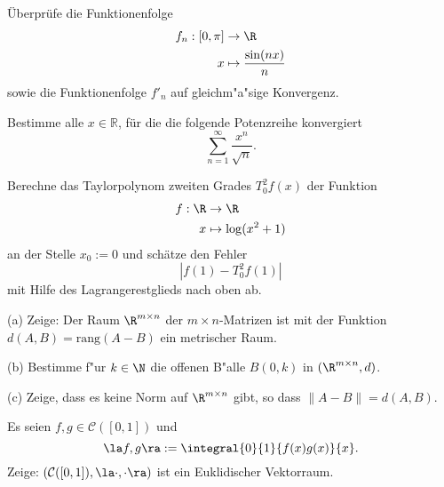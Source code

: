 \begin{prob}
Überprüfe die Funktionenfolge
\begin{equation*}
\begin{split}
f_n:[0,\pi]&\to\R\\
x&\mapsto \frac{\sin(nx)}{n}
\end{split}
\end{equation*}
sowie die Funktionenfolge $f'_n$ auf gleichm"a"sige Konvergenz.
\end{prob}

\vspace{0.3cm}

\begin{prob}
Bestimme alle $x\in \mathbb{R}$, für die die folgende Potenzreihe konvergiert
$$\sum_{n=1}^\infty \frac{x^n}{\sqrt{n}}.$$ 
\end{prob}

\vspace{0.3cm}

\begin{prob}
Berechne das Taylorpolynom  zweiten Grades $T_0^2f(x)$ der Funktion 
\begin{equation*}
\begin{split}
f:\R&\to\R\\
x&\mapsto \log(x^2+1)
\end{split}
\end{equation*}
an der Stelle $x_0:=0$ und schätze den Fehler
$$|f(1)-T_0^2f(1)|$$
mit Hilfe des Lagrangerestglieds nach oben ab. 
\end{prob}

\vspace{0.3cm}

\begin{prob}
(a) Zeige: Der Raum $\R^{m\times n}$ der $m\times n$-Matrizen ist mit der Funktion $d(A,B)=\text{rang}(A-B)$ ein metrischer Raum.

(b) Bestimme f"ur $k\in\N$ die offenen B"alle $B(0,k)$ in $(\R^{m\times n},d)$.

(c) Zeige, dass es keine Norm auf $\R^{m\times n}$ gibt, so dass $\|A-B\|=d(A,B)$.
\end{prob}

\vspace{0.3cm}

\begin{prob}
Es seien $f,g\in\mathcal{C}([0,1])$ und
$$\la f,g\ra:=\integral{0}{1}{f(x)g(x)}{x}.$$
Zeige: $(\mathcal{C}([0,1]),\la\cdot,\cdot\ra)$ ist ein Euklidischer Vektorraum.
\end{prob}

